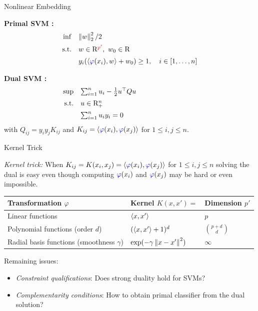 \documentclass[9pt]{beamer}
\begin{document}
\begin{frame}{Nonlinear Embedding}

    \textbf{Primal SVM : }
    \[
      \begin{array}{rl}
        \inf & \norm{w}_2^2/2 \\[0.5em]
        \st & w\in\Re^{\red{p'}},~w_0\in\Re\\[0.5em] 
             & y_i(\iprod{\emph{\varphi}(x_i)}{w} + w_0) \geq 1, \quad i \in [1, \dots, n]
      \end{array}
    \]

    \vfill

    \textbf{Dual SVM :}
    \[
      \begin{array}{rl}
        \sup & \sum_{i=1}^n u_i - \frac12 u\tpose Q u \hspace{8.7em}\\[0.5em]
        \st & u \in \Re^n_+ \\[0.5em] 
             & \sum_{i=1}^n u_i y_i = 0
      \end{array}
    \]
    with $Q_{ij} = y_i y_j K_{ij}$ and $K_{ij}=\iprod{\emph{\varphi}(x_i)}{\emph{\varphi}(x_j)}$ for $1\leq i, j\leq n$.
\end{frame}


\begin{frame}{Kernel Trick}

  \emph{Kernel trick:} When $K_{ij} = K(x_i, x_j) = \iprod{\emph{\varphi}(x_i)}{\emph{\varphi}(x_j)}$ for $1\leq i, j\leq n$ solving the dual is easy even though computing $\emph{\varphi}(x_i)$ and $\emph{\varphi}(x_j)$ may be hard or even impossible.

  \vfill

  \begin{center}
    \begin{tabular}{lll}
      \hline
      Transformation $\varphi$ & Kernel $K(x, x')=$ & Dimension $p'$ \\
      \hline
      Linear functions & $\iprod{x}{x'}$ & $p$\\
      Polynomial functions (order $d$) & $(\iprod{x}{x'} + 1)^d$ & $\binom{p+d}{d}$ \\
      Radial basis functions (smoothness $\gamma$)  & $\exp(-\gamma\norm{x-x'}^2)$ & $\infty$\\
      \hline
    \end{tabular}
  \end{center}

  \vfill

  Remaining issues:
  \begin{itemize}
  \item<2-> \emph{Constraint qualifications}: Does strong duality hold for SVMs?
  \item<3-> \emph{Complementarity conditions}: How to obtain primal classifier from the dual solution?
  \end{itemize}
  
\end{frame}
\end{document}
